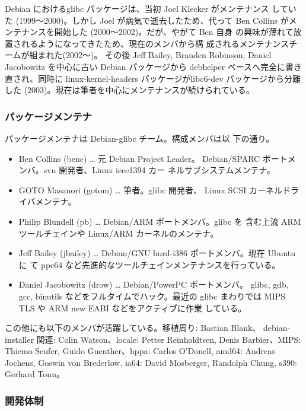 \documentclass[mingoth]{jsarticle}
\begin{document}
    Debian におけるglibc パッケージは、当初 Joel Klecker がメンテナンス
    していた (1999〜2000)。しかし Joel が病気で逝去したため、代って Ben
    Collins がメンテナンスを開始した (2000〜2002)。だが、やがて Ben 自身
    の興味が薄れて放置されるようになってきたため、現在のメンバから構
    成されるメンテナンスチームが組まれた(2002〜)。
    その後 Jeff Bailey, Branden Robinson, Daniel Jacobowitz を中心に古い 
    Debian パッケージから debhelper ベースへ完全に書き直され、同時に
    linux-kernel-headers パッケージがlibc6-dev パッケージから分離した 
    (2003)。現在は筆者を中心にメンテナンスが続けられている。

  \subsubsection{パッケージメンテナ}

    パッケージメンテナは Debian-glibc チーム。構成メンバは以
    下の通り。

	\begin{itemize}
	\item Ben Collins (benc) … 元 Debian Project Leader。
	      Debian/SPARC ポートメンバ。svn 開発者、Linux ieee1394 カー
	      ネルサブシステムメンテナ。
	\item GOTO Masanori (gotom) … 筆者。glibc 開発者、
	      Linux SCSI カーネルドライバメンテナ。
	\item Philip Blundell (pb) … Debian/ARM ポートメンバ。glibc を
	      含む上流 ARM ツールチェインや Linux/ARM カーネルのメンテナ。
	\item Jeff Bailey (jbailey) … Debian/GNU hurd-i386 ポートメンバ。現在 Ubuntu に
	      て ppc64 など先進的なツールチェインメンテナンスを行っている。
	\item Daniel Jacobowitz (drow) … Debian/PowerPC ポートメンバ。
	      glibc, gdb, gcc, binutils などをフルタイムでハック。最近の glibc 
	      まわりでは MIPS TLS や ARM new EABI などをアクティブに作業
	      している。
	\end{itemize}

      この他にも以下のメンバが活躍している。移植周り: Bastian Blank、
      debian-installer 関連: Colin Watson、locale: Petter Reinholdtsen,
      Denis Barbier、MIPS: Thiemo Seufer, Guido Guenther、hppa:
      Carlos O'Donell, amd64: Andreas Jochens, Goswin von Brederlow,
      ia64: David Mosberger, Randolph Chung, s390: Gerhard Tonn。

    \subsubsection{開発体制}
\end{document}
